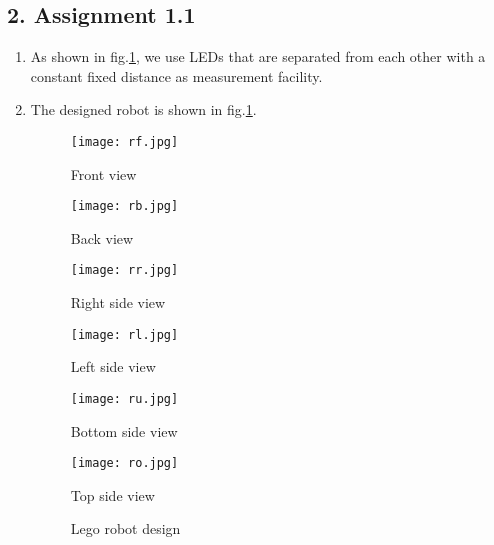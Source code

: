 \subsection*{2. Assignment 1.1}
\begin{enumerate}
\item As shown in fig.\ref{legobot}, we use LEDs that are separated from each other with a constant fixed distance as measurement facility.
\item The designed robot is shown in fig.\ref{legobot}.
\begin{figure}[ht]
  \begin{minipage}[b]{0.3\textwidth}
    \centering
    \texttt{[image: rf.jpg]}
    \captionsetup{labelformat=empty}
    \caption{Front view} 
    \vspace{4ex}
  \end{minipage}%
  \begin{minipage}[b]{0.3\textwidth}
    \centering
    \texttt{[image: rb.jpg]}
    \captionsetup{labelformat=empty}
    \caption{Back view} 
    \vspace{4ex}
  \end{minipage} 
  \begin{minipage}[b]{0.3\textwidth}
    \centering
    \texttt{[image: rr.jpg]}
    \captionsetup{labelformat=empty}
    \caption{Right side view} 
    \vspace{4ex}
  \end{minipage}%
\newline
  \begin{minipage}[b]{0.3\textwidth}
    \centering
    \texttt{[image: rl.jpg]}
    \captionsetup{labelformat=empty}
    \caption{Left side view} 
    \vspace{4ex}
  \end{minipage}
  \begin{minipage}[b]{0.3\textwidth}
	\centering
	\texttt{[image: ru.jpg]}
	\captionsetup{labelformat=empty}
	\caption{Bottom side view} 
	\vspace{4ex}
\end{minipage}%
\begin{minipage}[b]{0.3\textwidth}
	\centering
	\texttt{[image: ro.jpg]}
	\captionsetup{labelformat=empty}
	\caption{Top side view} 
	\vspace{4ex}
\end{minipage}
\caption{Lego robot design}
\label{legobot}
\end{figure}


\end{enumerate}
